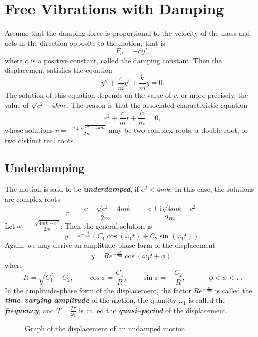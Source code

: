 \section{Free Vibrations with Damping}
Assume that the damping force is proportional to the velocity of the mass and acts in the direction opposite to the motion, that is
\[F_d=-cy',\]
where $c$ is a positive constant, called the damping constant. Then the displacement satisfies the equation
\[y''+\frac{c}{m}y'+\frac{k}{m}y=0.\]
The solution of this equation depends on the value of $c$, or more precisely, the value of $\sqrt{c^2-4km}$. The reason is that the associated characteristic equation 
\[r^2+\frac{c}{m}r+\frac{k}{m}=0,\]
whose solutions
$r=\frac{-c\pm\sqrt{c^2-4km}}{2m}$
may be two complex roots, a double root, or two distinct real roots.

\subsection*{Underdamping} 

The motion is said to be \emph{\textbf{underdamped}}, if $c^2<4mk$. In this case, the solutions are complex roots 
\[r=\frac{-c\pm\sqrt{c^2-4mk}}{2m}=\frac{-c\pm\mathrm{i}\sqrt{4mk-c^2}}{2m}.\] 
Let $\omega_1=\frac{\sqrt{4mk-c^2}}{2m}$. Then the general solution is
\[y=e^{-\frac{ct}{2m}}(C_1\cos(\omega_1 t) + C_2\sin(\omega_1 t)).\]
Again, we may derive an amplitude-phase form of the displacement
\[y=Re^{-\frac{ct}{2m}}\cos(\omega_1 t +\phi),\]
where
\[R=\sqrt{C_1^2+C_2^2},\qquad \cos\phi=\frac{C_1}{R},\qquad \sin\phi=-\frac{C_2}{R},\qquad -\phi<\phi<\pi.\]
In the amplitude-phase form of the displacement, the factor $Re^{-\frac{ct}{2m}}$ is called the \emph{\textbf{time–varying amplitude}} of the motion, the quantity $\omega_1$ is called the \emph{\textbf{frequency}}, and $T=\frac{2\pi}{\omega_1}$ is called the \emph{\textbf{quasi–period}} of the displacement.

\begin{figure}[htb]
  \centering
\caption[Undamped motion]{Graph of the displacement of an undamped motion}
\end{figure}

